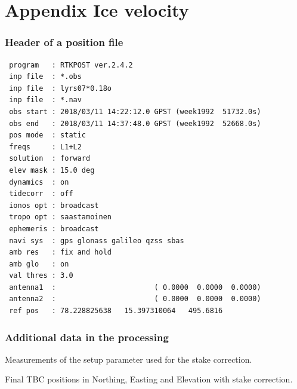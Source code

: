 

\chapter{Appendix Ice velocity}
\label{studentxx:appendix}

\subsection*{Header of a position file}
\begin{verbatim}
 program   : RTKPOST ver.2.4.2
 inp file  : *.obs
 inp file  : lyrs07*0.18o
 inp file  : *.nav
 obs start : 2018/03/11 14:22:12.0 GPST (week1992  51732.0s)
 obs end   : 2018/03/11 14:37:48.0 GPST (week1992  52668.0s)
 pos mode  : static
 freqs     : L1+L2
 solution  : forward
 elev mask : 15.0 deg
 dynamics  : on
 tidecorr  : off
 ionos opt : broadcast
 tropo opt : saastamoinen
 ephemeris : broadcast
 navi sys  : gps glonass galileo qzss sbas
 amb res   : fix and hold
 amb glo   : on
 val thres : 3.0
 antenna1  :                       ( 0.0000  0.0000  0.0000)
 antenna2  :                       ( 0.0000  0.0000  0.0000)
 ref pos   : 78.228825638   15.397310064   495.6816
\end{verbatim}

\subsection*{Additional data in the processing}

\begin{table}[H]
	\caption{Measurements of the setup parameter used for the stake correction.}
	\centering
	\begin{turn}{90}
		\scriptsize
		
		\label{GPS:tab:fb_other_tab}
	\end{turn}
\end{table}


\begin{table}[H]
	\caption{Final TBC positions in Northing, Easting and Elevation with stake correction.}
	\centering 
	
	\label{GPS:tab:tbc_tab}
\end{table}

